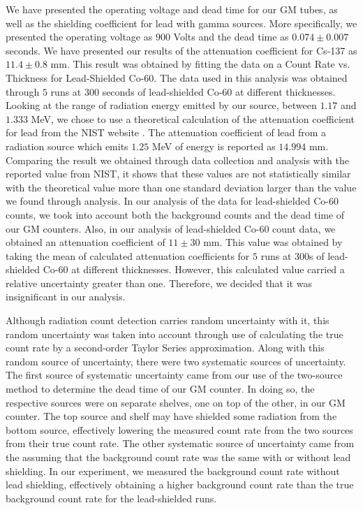 \par We have presented the operating voltage and dead time for our GM tubes, as well as the shielding coefficient for lead with gamma sources. More specifically, we presented the operating voltage as $900$ Volts and the dead time as $0.074 \pm 0.007$ seconds. We have presented our results of the attenuation coefficient for Cs-137 as $11.4 \pm 0.8$ mm. This result was obtained by fitting the data on a Count Rate vs. Thickness for Lead-Shielded Co-60. The data used in this analysis was obtained through $5$ runs at $300$ seconds of lead-shielded Co-60 at different thicknesses. Looking at the range of radiation energy emitted by our source, between $1.17$ and $1.333$ MeV, we chose to use a theoretical calculation of the attenuation coefficient for lead from the NIST website \cite{Shielding}. The attenuation coefficient of lead from a radiation source which emits $1.25$ MeV of energy is reported as $14.994$ mm. Comparing the result we obtained through data collection and analysis with the reported value from NIST, it shows that these values are not statistically similar with the theoretical value more than one standard deviation larger than the value we found through analysis. In our analysis of the data for lead-shielded Co-60 counts, we took into account both the background counts and the dead time of our GM counters. Also, in our analysis of lead-shielded Co-60 count data, we obtained an attenuation coefficient of $11 \pm 30$ mm. This value was obtained by taking the mean of calculated attenuation coefficients for $5$ runs at $300$s of lead-shielded Co-60 at different thicknesses. However, this calculated value carried a relative uncertainty greater than one. Therefore, we decided that it was insignificant in our analysis.
\par Although radiation count detection carries random uncertainty with it, this random uncertainty was taken into account through use of calculating the true count rate by a second-order Taylor Series approximation. Along with this random source of uncertainty, there were two systematic sources of uncertainty. The first source of systematic uncertainty came from our use of the two-source method to determine the dead time of our GM counter. In doing so, the respective sources were on separate shelves, one on top of the other, in our GM counter. The top source and shelf may have shielded some radiation from the bottom source, effectively lowering the measured count rate from the two sources from their true count rate. The other systematic source of uncertainty came from the assuming that the background count rate was the same with or without lead shielding. In our experiment, we measured the background count rate without lead shielding, effectively obtaining a higher background count rate than the true background count rate for the lead-shielded runs. 